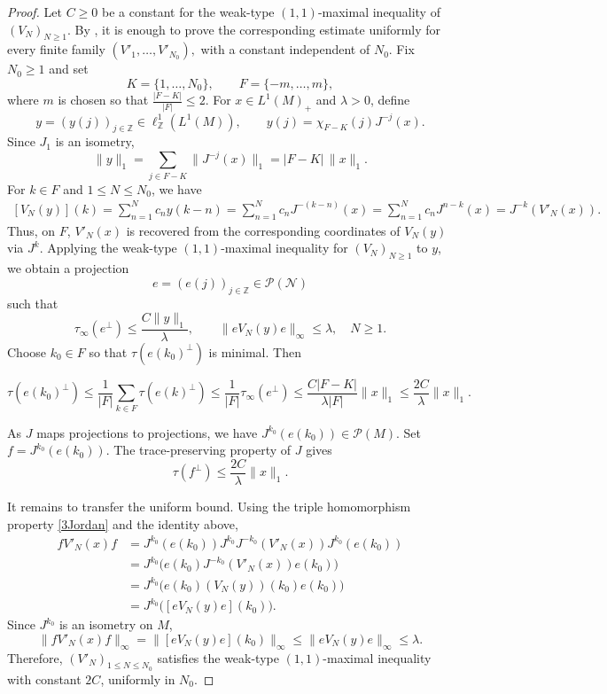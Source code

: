 \documentclass[12pt]{amsart}
\theoremstyle{remark}
\theoremstyle{definition}
\numberwithin{equation}{section}
\begin{document}
\begin{proof}
Let $C\ge0$ be a constant for the weak-type $(1,1)$-maximal inequality of $(V_N)_{N\ge1}$. By \cite[Lemma 2.3]{HLW}, it is enough to prove the corresponding estimate uniformly for every finite family
\((V'_1,\ldots,V'_{N_0}),
\)
with a constant independent of $N_0$. Fix $N_0\ge1$ and set
\[
K=\{1,\ldots,N_0\},
\qquad
F=\{-m,\ldots,m\},
\]
where $m$ is chosen so that
\(
\frac{|F-K|}{|F|}\le2.
\)
For $x\in L^1(M)_+$ and $\lambda>0$, define
\[
y=(y(j))_{j\in\mathbb Z}\in\ell^1_{\mathbb Z}(L^1(M)),
\qquad
y(j)=\chi_{F-K}(j)J^{-j}(x).
\]
Since $J_1$ is an isometry,
\begin{equation}\label{3L1}
\|y\|_1
=\sum_{j\in F-K}\|J^{-j}(x)\|_1
=|F-K|\, \|x\|_1.
\end{equation}
For $k\in F$ and $1\le N\le N_0$, we have
\[
\begin{aligned}
[V_N(y)](k)=\sum_{n=1}^N c_n y(k-n)=\sum_{n=1}^N c_nJ^{-(k-n)}(x)=\sum_{n=1}^N c_nJ^{n-k}(x)=J^{-k}(V'_N(x)).
\end{aligned}
\]
Thus, on \(F\), \(V'_N(x)\) is recovered from the corresponding coordinates of \(V_N(y)\) via \(J^k\). Applying the weak-type $(1,1)$-maximal inequality for $(V_N)_{N\ge1}$ to $y$, we obtain a projection
\[
e=(e(j))_{j\in\mathbb Z}\in\mathcal P(\mathcal N)
\]
such that
\[
\tau_\infty(e^\perp)\le\frac{C\|y\|_1}{\lambda},
\qquad
\|eV_N(y)e\|_\infty\le\lambda,
\quad N\ge1.
\]
Choose $k_0\in F$ so that $\tau(e(k_0)^\perp)$ is minimal. Then

\[
\tau(e(k_0)^\perp)\le \frac1{|F|}\sum_{k\in F}\tau(e(k)^\perp)
\le \frac1{|F|}\tau_\infty(e^\perp)
\le \frac{C|F-K|}{\lambda|F|}\|x\|_1
\le \frac{2C}{\lambda}\|x\|_1.
\]

As $J$ maps projections to projections, we have \(J^{k_0}(e(k_0))\in\mathcal P(M)\). Set \(f=J^{k_0}(e(k_0))\).
The trace-preserving property of $J$ gives
\[
\tau(f^\perp)\le\frac{2C}{\lambda}\|x\|_1.
\]

It remains to transfer the uniform bound. Using the triple homomorphism property \eqref{3Jordan} and the identity above,
\begin{align*} 
f V'_N(x) f &= J^{k_0}(e(k_0)) J^{k_0}J^{-k_0} (V'_N(x)) J^{k_0}(e(k_0)) \\ &= J^{k_0}\bigl(e(k_0) J^{-k_0}(V'_N(x)) e(k_0)\bigr) \\ &= J^{k_0}\bigl(e(k_0) (V_N(y))(k_0) e(k_0)\bigr) \\ &= J^{k_0}\bigl([e V_N(y) e](k_0)\bigr). 
\end{align*}
Since $J^{k_0}$ is an isometry on $M$,
 \[ \|f V'_N(x) f\|_\infty = \|[e V_N(y) e](k_0)\|_\infty \le \|e V_N(y) e\|_\infty \le \lambda. \]
Therefore, $(V'_N)_{1\le N\le N_0}$ satisfies the weak-type $(1,1)$-maximal inequality with constant $2C$, uniformly in $N_0$. 
\end{proof}
\end{document}
